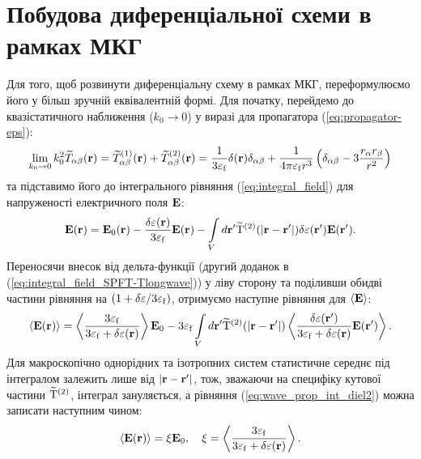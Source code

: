\documentclass[14pt,twoside]{vakthesis}
\begin{document}
\section{Побудова диференціальної схеми в рамках МКГ}

Для того, щоб розвинути диференціальну схему в рамках МКГ, переформулюємо його у більш зручній еквівалентній формі.
Для початку, перейдемо до квазістатичного наближення ($k_0 \to 0$) у виразі для пропагатора (\ref{eq:propagator-eps}):
\begin{equation}\label{eq:prop_longwave_diel}
\lim\limits_{k_0 \to 0} k_0^2 {\widetilde T}_{\alpha \beta} ( {\mathbf{r}} ) = {\widetilde T}_{\alpha \beta}^{(1)} ( {\mathbf{r}} ) + {\widetilde T}_{\alpha \beta}^{(2)}( {\mathbf{r}} ) = \frac{1}{3 \varepsilon_{\rm f}}\delta ({\mathbf{r}}) \delta_{\alpha \beta}
+ \frac{1}{4\pi \varepsilon_{\rm f} r^3} \left( \delta_{\alpha \beta} - 3 \frac{r_{\alpha} r_{\beta}}{r^2} \right)
\end{equation}
та підставимо його до інтегрального рівняння (\ref{eq:integral_field}) для напруженості електричного поля $\bf E$:
\begin{equation}\label{eq:integral_field_SPFT-Tlongwave}
\mathbf{E}(\mathbf{r}) = \mathbf{E}_0(\mathbf{r}) - \frac{\delta\varepsilon({\bf r})}{3 \varepsilon_{\rm f}} \mathbf{E}(\mathbf{r}) - \int\limits_V {d{\mathbf{r}}'}
{\rm{\widetilde T}}^{(2)} (|{\mathbf{r}} - {\mathbf{r}}'|) \delta \varepsilon ({\mathbf{r}}'){\mathbf{E}}({\mathbf{r}}'). 
\end{equation}
Переносячи внесок від дельта-функції (другий доданок в (\ref{eq:integral_field_SPFT-Tlongwave})) у ліву сторону та поділивши обидві частини рівняння на $(1+\delta\varepsilon/3\varepsilon_{\rm f})$,
отримуємо наступне рівняння для $\langle \bf E \rangle$:
\begin{equation}
\langle \mathbf{E} (\mathbf{r}) \rangle = \left\langle \frac{ 3 \varepsilon_{\rm f}  }{3 \varepsilon_{\rm f} + \delta\varepsilon({\bf r})} \right\rangle \mathbf{E}_0
- 3 \varepsilon_{\rm f} \int\limits_V {d{\mathbf{r}}'} { \rm{\widetilde T}}^{(2)} (| {\bf r} - {\bf r}' |)     \left\langle \frac{\delta \varepsilon ({\mathbf{r}}')}{3 \varepsilon_{\rm f} + \delta \varepsilon({\bf r})}{\mathbf{E}}({\mathbf{r}}') \right\rangle  .
\label{eq:wave_prop_int_diel2}
\end{equation}
Для макроскопічно однорідних та ізотропних систем статистичне
середнє під інтегралом залежить лише від $|{\bf r} - {\bf r}'|$,
тож, зважаючи на специфіку кутової частини ${ \rm{\widetilde T}}^{(2)}$,
інтеграл зануляється, а рівняння (\ref{eq:wave_prop_int_diel2})
можна записати наступним чином:
\begin{equation}\label{eq:E_average_diel}
\langle {\bf E} ({\bf r}) \rangle =  \xi {\bf E}_0,\quad
\xi  = \left\langle { \frac{3 \varepsilon_{\rm f}}{3 \varepsilon_{\rm f} + \delta\varepsilon({\bf r})} } \right\rangle.
\end{equation}
\end{document}
